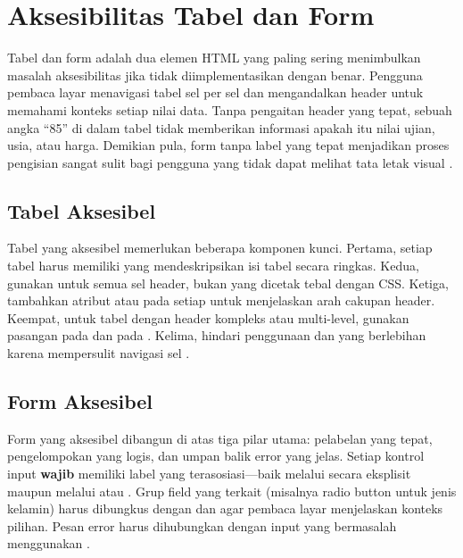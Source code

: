 ﻿\section{Aksesibilitas Tabel dan Form}

Tabel dan form adalah dua elemen HTML yang paling sering menimbulkan masalah aksesibilitas jika tidak diimplementasikan dengan benar. Pengguna pembaca layar menavigasi tabel sel per sel dan mengandalkan header untuk memahami konteks setiap nilai data. Tanpa pengaitan header yang tepat, sebuah angka ``85'' di dalam tabel tidak memberikan informasi apakah itu nilai ujian, usia, atau harga. Demikian pula, form tanpa label yang tepat menjadikan proses pengisian sangat sulit bagi pengguna yang tidak dapat melihat tata letak visual \cite{mdnAccessibility}.

\subsection{Tabel Aksesibel}

Tabel yang aksesibel memerlukan beberapa komponen kunci. Pertama, setiap tabel harus memiliki  yang mendeskripsikan isi tabel secara ringkas. Kedua, gunakan  untuk semua sel header, bukan  yang dicetak tebal dengan CSS. Ketiga, tambahkan atribut  atau  pada setiap  untuk menjelaskan arah cakupan header. Keempat, untuk tabel dengan header kompleks atau multi-level, gunakan pasangan  pada  dan  pada . Kelima, hindari penggunaan  dan  yang berlebihan karena mempersulit navigasi sel \cite{webdevAccessibility}.

\subsection{Form Aksesibel}

Form yang aksesibel dibangun di atas tiga pilar utama: pelabelan yang tepat, pengelompokan yang logis, dan umpan balik error yang jelas. Setiap kontrol input \textbf{wajib} memiliki label yang terasosiasi---baik melalui  secara eksplisit maupun melalui  atau . Grup field yang terkait (misalnya radio button untuk jenis kelamin) harus dibungkus dengan  dan  agar pembaca layar menjelaskan konteks pilihan. Pesan error harus dihubungkan dengan input yang bermasalah menggunakan  \cite{mdnAccessibility}.

